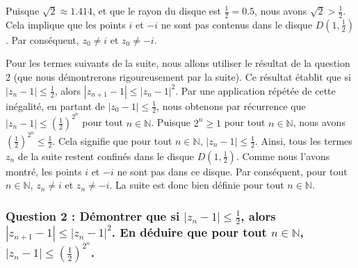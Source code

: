 \documentclass[a4paper,11pt]{report}
\begin{document}
Puisque $\sqrt{2} \approx 1.414$, et que le rayon du disque est $\frac{1}{2} = 0.5$, nous avons $\sqrt{2} > \frac{1}{2}$.
Cela implique que les points $i$ et $-i$ ne sont pas contenus dans le disque $D(1, \frac{1}{2})$. Par conséquent, $z_0 \neq i$ et $z_0 \neq -i$.

Pour les termes suivants de la suite, nous allons utiliser le résultat de la question 2 (que nous démontrerons rigoureusement par la suite). Ce résultat établit que si $|z_n - 1| \le \frac{1}{2}$, alors $|z_{n+1} - 1| \le |z_n - 1|^2$.
Par une application répétée de cette inégalité, en partant de $|z_0 - 1| \le \frac{1}{2}$, nous obtenons par récurrence que $|z_n - 1| \le \left(\frac{1}{2}\right)^{2^n}$ pour tout $n \in \mathbb{N}$.
Puisque $2^n \ge 1$ pour tout $n \in \mathbb{N}$, nous avons $\left(\frac{1}{2}\right)^{2^n} \le \frac{1}{2}$.
Cela signifie que pour tout $n \in \mathbb{N}$, $|z_n - 1| \le \frac{1}{2}$.
Ainsi, tous les termes $z_n$ de la suite restent confinés dans le disque $D(1, \frac{1}{2})$.
Comme nous l'avons montré, les points $i$ et $-i$ ne sont pas dans ce disque. Par conséquent, pour tout $n \in \mathbb{N}$, $z_n \neq i$ et $z_n \neq -i$.
La suite est donc bien définie pour tout $n \in \mathbb{N}$.

\subsubsection*{Question 2 : Démontrer que si $|z_n - 1| \le \frac{1}{2}$, alors $|z_{n+1} - 1| \le |z_n - 1|^2$. En déduire que pour tout $n \in \mathbb{N}$, $|z_n - 1| \le \left(\frac{1}{2}\right)^{2^n}$.}
\end{document}
